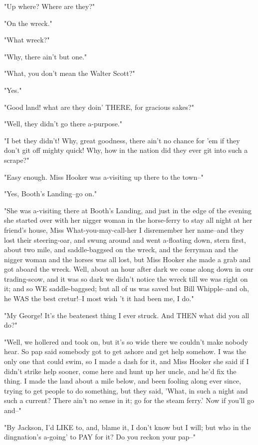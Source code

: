 "Up where?  Where are they?"

"On the wreck."

"What wreck?"

"Why, there ain't but one."

"What, you don't mean the Walter Scott?"

"Yes."

"Good land! what are they doin' THERE, for gracious sakes?"

"Well, they didn't go there a-purpose."

"I bet they didn't!  Why, great goodness, there ain't no chance for 'em
if they don't git off mighty quick!  Why, how in the nation did they ever
git into such a scrape?"

"Easy enough.  Miss Hooker was a-visiting up there to the town--"

"Yes, Booth's Landing--go on."

"She was a-visiting there at Booth's Landing, and just in the edge of the
evening she started over with her nigger woman in the horse-ferry to stay
all night at her friend's house, Miss What-you-may-call-her I disremember
her name--and they lost their steering-oar, and swung around and went
a-floating down, stern first, about two mile, and saddle-baggsed on the
wreck, and the ferryman and the nigger woman and the horses was all lost,
but Miss Hooker she made a grab and got aboard the wreck.  Well, about an
hour after dark we come along down in our trading-scow, and it was so
dark we didn't notice the wreck till we was right on it; and so WE
saddle-baggsed; but all of us was saved but Bill Whipple--and oh, he WAS
the best cretur!--I most wish 't it had been me, I do."

"My George!  It's the beatenest thing I ever struck.  And THEN what did
you all do?"

"Well, we hollered and took on, but it's so wide there we couldn't make
nobody hear.  So pap said somebody got to get ashore and get help
somehow. I was the only one that could swim, so I made a dash for it, and
Miss Hooker she said if I didn't strike help sooner, come here and hunt
up her uncle, and he'd fix the thing.  I made the land about a mile
below, and been fooling along ever since, trying to get people to do
something, but they said, 'What, in such a night and such a current?
There ain't no sense in it; go for the steam ferry.'  Now if you'll go
and--"

"By Jackson, I'd LIKE to, and, blame it, I don't know but I will; but who
in the dingnation's a-going' to PAY for it?  Do you reckon your pap--"

